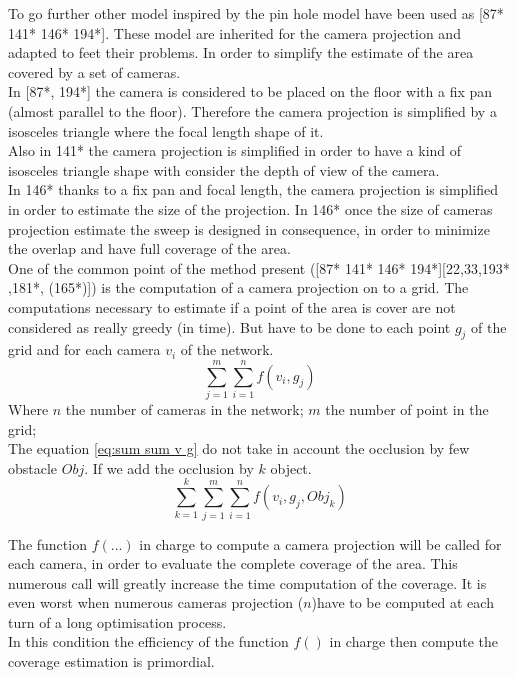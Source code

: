 To go further other model inspired by the pin hole model have been used as [87* 141* 146* 194*]. These model are inherited for the camera projection and adapted to feet their problems. In order to simplify the estimate of the area covered by a set of cameras. \\
In [87*, 194*] the camera is considered to be placed on the floor with a fix pan (almost parallel to the floor). Therefore the camera projection is simplified by a isosceles triangle where the focal length shape of it.\\
Also in 141* the camera projection is simplified in order to have a kind of isosceles triangle shape with  
consider the depth of view of the camera.\\
In 146* thanks to a fix pan and focal length, the camera projection is simplified in order to estimate the size of the projection. In 146* once the size of cameras projection estimate the sweep is designed  in consequence, in order to minimize the overlap and  have full coverage of the area.   \\


One of the common point of the method present  ([87* 141* 146* 194*][22,33,193* ,181*, (165*)]) is the computation of a camera projection on to a grid. The computations necessary to estimate if a point of the area is cover are not considered as really greedy (in time). But have to be done to each point $g_j$ of the grid and for each camera $v_i$ of the network.
	\begin{equation} \label{eq:sum sum v g}
		\sum_{j=1}^{m}\sum_{i=1}^{n}f( v_i,g_j)
	\end{equation}
Where $n$ the number of cameras in the network; $m$ the number of  point in the grid; \\
The equation \ref{eq:sum sum v g} do not  take in account the occlusion by few obstacle $Obj$. If we add the occlusion  by $k$ object. 
	\begin{equation}
		 \sum_{k=1}^{k}\sum_{j=1}^{m}\sum_{i=1}^{n}f( v_i,g_j,Obj_k)
	\end{equation} 
 
The function  $f(...)$ in charge to compute a camera projection will be called for each camera, in order to evaluate the complete coverage of the area. This numerous call will greatly increase the time computation of the coverage.  It is even worst when numerous cameras projection ($n$)have to be computed at each turn of a long optimisation process.\\
In this condition the efficiency of the function $f()$ in charge then compute the coverage estimation is primordial.



